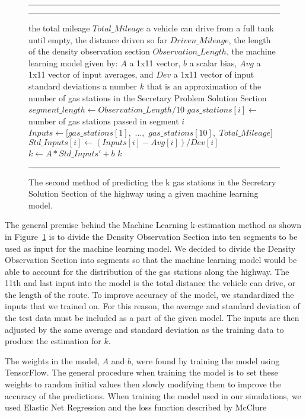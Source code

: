 \begin{figure}[!hbt]
\vspace{0.2cm}
\hrule \medskip {} \smallskip
\hrule
\smallskip
\begin{algorithmic}[1]
 the total mileage $Total\_Mileage$ a vehicle can drive from a full tank until empty, the distance driven so far $Driven\_Mileage$, the length of the density observation section $Observation\_Length$, the machine learning model given by: $A$ a 1x11 vector, $b$ a scalar bias, $Avg$ a 1x11 vector of input averages, and $Dev$ a 1x11 vector of input standard deviations
 a number $k$ that is an approximation of the number of gas stations in the Secretary Problem Solution Section
\STATE $segment\_length \gets Observation\_Length / 10$
\STATE $gas\_stations[i] \gets $ number of gas stations passed in segment $i$
\ENDFOR \\
\STATE $Inputs \gets [gas\_stations[1],$ $\ldots,$ $gas\_stations[10],$ $Total\_Mileage]$
\STATE $Std\_Inputs[i] \gets (Inputs[i]-Avg[i])/Dev[i]$
\ENDFOR
\STATE $k \gets A * Std\_Inputs' + b$
\RETURN $k$
\end{algorithmic}
\hrule
\caption{The second method of predicting the k gas stations in the Secretary Solution Section of the highway using a given machine learning model.}
\label{fig:ml-est}
\end{figure}

The general premise behind the Machine Learning k-estimation method as shown in Figure~\ref{fig:ml-est} is to divide the Density Observation Section into ten segments to be used as input for the machine learning model. We decided to divide the Density Observation Section into segments so that the machine learning model would be able to account for the distribution of the gas stations along the highway. The 11th and last input into the model is the total distance the vehicle can drive, or the length of the route. To improve accuracy of the model, we standardized the inputs that we trained on. For this reason, the average and standard deviation of the test data must be included as a part of the given model. The inputs are then adjusted by the same average and standard deviation as the training data to produce the estimation for $k$.

The weights in the model, $A$ and $b$, were found by training the model using TensorFlow. The general procedure when training the model is to set these weights to random initial values then slowly modifying them to improve the accuracy of the predictions. When training the model used in our simulations, we used Elastic Net Regression and the loss function described by McClure \cite{McClure}